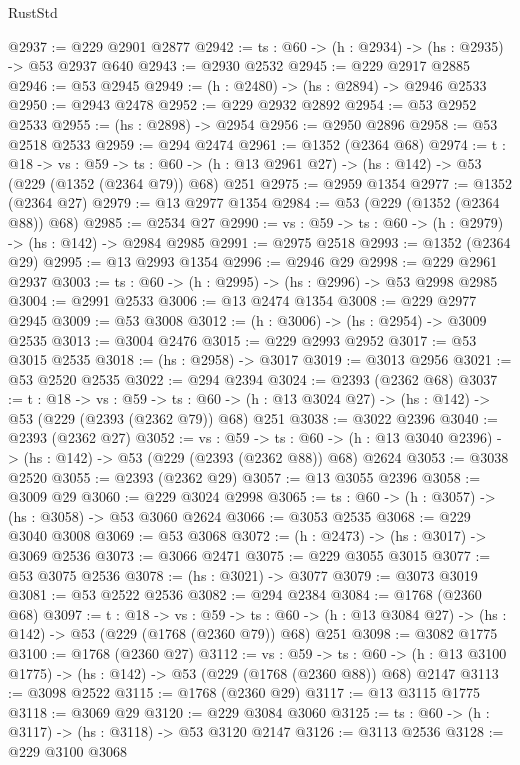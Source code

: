 \begin{lexlean}{RustStd}
\begin{coremodule}
@2937 := @229 @2901 @2877
@2942 := {ts : @60} -> (h : @2934) -> (hs : @2935) -> @53 @2937 @640
@2943 := @2930 @2532
@2945 := @229 @2917 @2885
@2946 := @53 @2945
@2949 := (h : @2480) -> (hs : @2894) -> @2946 @2533
@2950 := @2943 @2478
@2952 := @229 @2932 @2892
@2954 := @53 @2952 @2533
@2955 := (hs : @2898) -> @2954
@2956 := @2950 @2896
@2958 := @53 @2518 @2533
@2959 := @294 @2474
@2961 := @1352 (@2364 @68)
@2974 := {t : @18} ->
  {vs : @59} ->
  {ts : @60} -> (h : @13 @2961 @27) -> (hs : @142) -> @53 (@229 (@1352 (@2364 @79)) @68) @251
@2975 := @2959 @1354
@2977 := @1352 (@2364 @27)
@2979 := @13 @2977 @1354
@2984 := @53 (@229 (@1352 (@2364 @88)) @68)
@2985 := @2534 @27
@2990 := {vs : @59} -> {ts : @60} -> (h : @2979) -> (hs : @142) -> @2984 @2985
@2991 := @2975 @2518
@2993 := @1352 (@2364 @29)
@2995 := @13 @2993 @1354
@2996 := @2946 @29
@2998 := @229 @2961 @2937
@3003 := {ts : @60} -> (h : @2995) -> (hs : @2996) -> @53 @2998 @2985
@3004 := @2991 @2533
@3006 := @13 @2474 @1354
@3008 := @229 @2977 @2945
@3009 := @53 @3008
@3012 := (h : @3006) -> (hs : @2954) -> @3009 @2535
@3013 := @3004 @2476
@3015 := @229 @2993 @2952
@3017 := @53 @3015 @2535
@3018 := (hs : @2958) -> @3017
@3019 := @3013 @2956
@3021 := @53 @2520 @2535
@3022 := @294 @2394
@3024 := @2393 (@2362 @68)
@3037 := {t : @18} ->
  {vs : @59} ->
  {ts : @60} -> (h : @13 @3024 @27) -> (hs : @142) -> @53 (@229 (@2393 (@2362 @79)) @68) @251
@3038 := @3022 @2396
@3040 := @2393 (@2362 @27)
@3052 := {vs : @59} ->
  {ts : @60} -> (h : @13 @3040 @2396) -> (hs : @142) -> @53 (@229 (@2393 (@2362 @88)) @68) @2624
@3053 := @3038 @2520
@3055 := @2393 (@2362 @29)
@3057 := @13 @3055 @2396
@3058 := @3009 @29
@3060 := @229 @3024 @2998
@3065 := {ts : @60} -> (h : @3057) -> (hs : @3058) -> @53 @3060 @2624
@3066 := @3053 @2535
@3068 := @229 @3040 @3008
@3069 := @53 @3068
@3072 := (h : @2473) -> (hs : @3017) -> @3069 @2536
@3073 := @3066 @2471
@3075 := @229 @3055 @3015
@3077 := @53 @3075 @2536
@3078 := (hs : @3021) -> @3077
@3079 := @3073 @3019
@3081 := @53 @2522 @2536
@3082 := @294 @2384
@3084 := @1768 (@2360 @68)
@3097 := {t : @18} ->
  {vs : @59} ->
  {ts : @60} -> (h : @13 @3084 @27) -> (hs : @142) -> @53 (@229 (@1768 (@2360 @79)) @68) @251
@3098 := @3082 @1775
@3100 := @1768 (@2360 @27)
@3112 := {vs : @59} ->
  {ts : @60} -> (h : @13 @3100 @1775) -> (hs : @142) -> @53 (@229 (@1768 (@2360 @88)) @68) @2147
@3113 := @3098 @2522
@3115 := @1768 (@2360 @29)
@3117 := @13 @3115 @1775
@3118 := @3069 @29
@3120 := @229 @3084 @3060
@3125 := {ts : @60} -> (h : @3117) -> (hs : @3118) -> @53 @3120 @2147
@3126 := @3113 @2536
@3128 := @229 @3100 @3068

\end{coremodule}
\end{lexlean}
